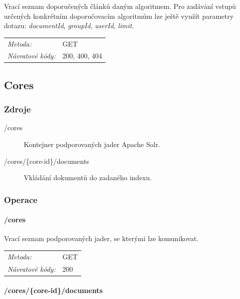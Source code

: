 \documentclass[thesis=M,czech]{FITthesis}[2014/05/07]
\begin{document}
Vrací seznam doporučených článků daným algoritmem. Pro zadávání vstupů určených konkrétním doporučovacím algoritmům lze ještě využít parametry dotazu: \emph{documentId}, \emph{groupId}, \emph{userId}, \emph{limit}.

\begin{center}
 	\begin{tabular}{lp{10cm}}
 		\textit{Metoda:}		& GET			\tabularnewline 
 		\textit{Návratové kódy:}		& 200, 400, 404			\tabularnewline 		
 	\end{tabular}
\end{center} 

\subsection{Cores}

\subsubsection{Zdroje}

\begin{description}
	\item[/cores] Kontejner podporovaných jader Apache Solr.
	\item[/cores/\{core-id\}/documents] Vkládání dokumentů do zadaného indexu.
\end{description}

\subsubsection{Operace}

\paragraph*{/cores}

Vrací seznam podporovaných jader, se kterými lze komunikovat.

\begin{center}
 	\begin{tabular}{lp{10cm}}
 		\textit{Metoda:}		& GET			\tabularnewline 
 		\textit{Návratové kódy:}		& 200			\tabularnewline 		
 	\end{tabular}
\end{center} 	

\paragraph*{/cores/\{core-id\}/documents}
\end{document}
